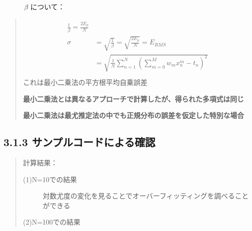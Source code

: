 \documentclass[letterpaper,10pt,dvipdfmx]{sphinxmanual}
\begin{document}
　　　\(\beta\) について：
\begin{quote}
\begin{align*}\!\begin{aligned}
\frac{1}{\beta} = \frac{2 E_p}{N}\\
\sigma &= \sqrt{\frac{1}{\beta}} = \sqrt{\frac{2 E_p}{N}} = E_{RMS} \\
       &= \sqrt{\frac{1}{N} \sum_{n=1}^{N} \left ( \sum_{m=0}^{M} w_m x_n^m -t_n \right )^2 }\\
\end{aligned}\end{align*}
これは最小二乗法の平方根平均自乗誤差

\textbf{最小二乗法とは異なるアプローチで計算したが、得られた多項式は同じ}

\textbf{最小二乗法は最尤推定法の中でも正規分布の誤差を仮定した特別な場合}
\end{quote}


\subsection{3.1.3 サンプルコードによる確認}
\label{Chapter_3_MLE:id6}\begin{quote}

計算結果：
\begin{description}
\item[{(1)N=10での結果}] \leavevmode
\noindent{}

対数尤度の変化を見ることでオーバーフィッティングを調べることができる

\noindent{}

\item[{(2)N=100での結果}] \leavevmode
\noindent{}

\noindent{}

\end{description}
\end{quote}
\end{document}
